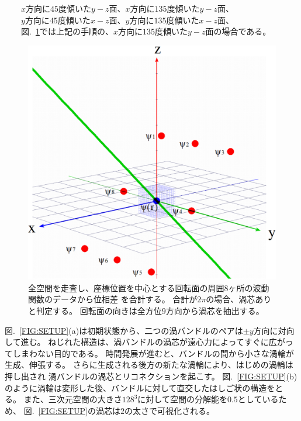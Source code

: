 \documentclass[12pt,a4paper]{jbook}
\begin{document}
            　　$x$方向に$45$度傾いた$y-z$面、$x$方向に$135$度傾いた$y-z$面、
            \\
            　　$y$方向に$45$度傾いた$x-z$面、$y$方向に$135$度傾いた$x-z$面、
            \\
			　　図.~\ref{FIG:qv_det}では上記の手順の、$x$方向に$135$度傾いた$y-z$面の場合である。
			\begin{figure}[H]
				\centering
				\includegraphics[width=12cm]{qv_det.eps}
				\caption{
					全空間を走査し、座標位置を中心とする回転面の周囲$8$ヶ所の波動関数のデータから位相差
                    を合計する。
                    合計が$2 \pi$の場合、渦芯ありと判定する。
                    回転面の向きは全方位$9$方向から渦芯を抽出する。
				}
				\label{FIG:qv_det}
			\end{figure}


			図.~\ref{FIG:SETUP}(a)は初期状態から、二つの渦バンドルのペアは$\pm y$方向に対向して進む。
			ねじれた構造は、渦バンドルの渦芯が遠心力によってすぐに広がってしまわない目的である。
			時間発展が進むと、バンドルの間から小さな渦輪が生成、伸張する。
			さらに生成される後方の新たな渦輪により、はじめの渦輪は押し出され
            渦バンドルの渦芯とリコネクションを起こす。
			図.~\ref{FIG:SETUP}(b)のように渦輪は変形した後、バンドルに対して直交したはしご状の構造をとる。
            また、三次元空間の大きさ$128^3$に対して空間の分解能を$0.5$としているため、
            図.~\ref{FIG:SETUP}の渦芯は$2$の太さで可視化される。
\end{document}
